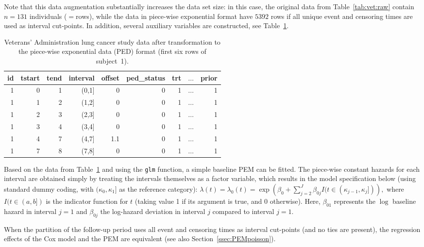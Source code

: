\documentclass[submit]{smj}
\begin{document}
Note that this data augmentation substantially increases the data set size: in
this case, the original data from Table~\ref{tab:vet:raw} contain $n=131$
individuals ($=$rows), while the data in piece-wise exponential format have $5392$
rows if all unique event and censoring times are used as interval cut-points.
In addition, several auxiliary variables are constructed, see Table~\ref{tab:vet:ped}.
\begin{table}[!b]
\caption{Veterans' Administration lung cancer study data after transformation to
the piece-wise exponential data (PED) format (first six rows of subject~1).}
\label{tab:vet:ped}
\begin{center}
\begin{tabular}{rrrrrrrcr}
  \hline
id & tstart & tend & interval &  offset & ped\_status & trt & $\ldots$ & prior \\
  \hline
1 & 0 & 1 & (0,1] & 0   & 0 & 1 & $\ldots$ & 1 \\
1 & 1 & 2 & (1,2] & 0   & 0 & 1 & $\ldots$ & 1 \\
1 & 2 & 3 & (2,3] & 0   & 0 & 1 & $\ldots$ & 1 \\
1 & 3 & 4 & (3,4] & 0   & 0 & 1 & $\ldots$ & 1 \\
1 & 4 & 7 & (4,7] & 1.1 & 0 & 1 & $\ldots$ & 1 \\
1 & 7 & 8 & (7,8] & 0   & 0 & 1 & $\ldots$ & 1 \\
   \hline
\end{tabular}
\end{center}
\end{table}
Based on the data from Table~\ref{tab:vet:ped} and using the \texttt{glm} function,
a simple baseline PEM can be fitted.
The piece-wise constant hazards for each interval are obtained simply by treating
the intervals themselves as a factor variable, which results in the model
specification below (using standard dummy coding, with $(\kappa_{0}, \kappa_{1}]$
as the reference category):
$\lambda(t) = \lambda_0(t) =
  \exp \left(
    \beta_0  + \sum_{j=2}^{J}\beta_{0j}I(t\in (\kappa_{j-1}, \kappa_j])
  \right),$ where $I(t \in (a,b])$ is the indicator function for $t$ (taking value 1 if its
argument is true, and 0 otherwise).
Here, $\beta_{01}$ represents the $\log$ baseline hazard in interval $j=1$ and
$\beta_{0j}$ the log-hazard deviation in interval $j$ compared to interval $j=1$.

When the partition of the follow-up period uses all event and censoring times as interval cut-points
(and no ties are present), the regression effects of the Cox model and the PEM are equivalent (see also Section~\ref{ssec:PEMpoisson}).
\end{document}
